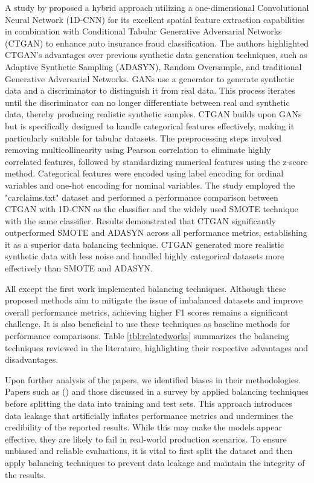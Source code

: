 \documentclass[twoside,11pt]{article}
\begin{document}
\begin{keywords}
A study by \cite{Wongpanti2024} proposed a hybrid approach utilizing a one-dimensional Convolutional Neural Network (1D-CNN) for its excellent spatial feature extraction capabilities in combination with Conditional Tabular Generative Adversarial Networks (CTGAN) to enhance auto insurance fraud classification. The authors highlighted CTGAN’s advantages over previous synthetic data generation techniques, such as Adaptive Synthetic Sampling (ADASYN), Random Oversample, and traditional Generative Adversarial Networks. GANs use a generator to generate synthetic data and a discriminator to distinguish it from real data. This process iterates until the discriminator can no longer differentiate between real and synthetic data, thereby producing realistic synthetic samples. CTGAN builds upon GANs but is specifically designed to handle categorical features effectively, making it particularly suitable for tabular datasets. The preprocessing steps involved removing multicollinearity using Pearson correlation to eliminate highly correlated features, followed by standardizing numerical features using the z-score method. Categorical features were encoded using label encoding for ordinal variables and one-hot encoding for nominal variables. The study employed the "carclaims.txt" dataset and performed a performance comparison between CTGAN with 1D-CNN as the classifier and the widely used SMOTE technique with the same classifier. Results demonstrated that CTGAN significantly outperformed SMOTE and ADASYN across all performance metrics, establishing it as a superior data balancing technique. CTGAN generated more realistic synthetic data with less noise and handled highly categorical datasets more effectively than SMOTE and ADASYN.

All except the first work implemented balancing techniques. Although these proposed methods aim to mitigate the issue of imbalanced datasets and improve overall performance metrics, achieving higher F1 scores remains a significant challenge. It is also beneficial to use these techniques as baseline methods for performance comparisons. Table \ref{tbl:relatedworks} summarizes the balancing techniques reviewed in the literature, highlighting their respective advantages and disadvantages.

Upon further analysis of the papers, we identified biases in their methodologies. Papers such as (\citealp{Harjai2019, Padhi2020}) and those discussed in a survey by \cite{schrijverAutomobileInsuranceFraud2024} applied balancing techniques before splitting the data into training and test sets. This approach introduces data leakage that artificially inflates performance metrics and undermines the credibility of the reported results. While this may make the models appear effective, they are likely to fail in real-world production scenarios. To ensure unbiased and reliable evaluations, it is vital to first split the dataset and then apply balancing techniques to prevent data leakage and maintain the integrity of the results. 



\end{keywords}
\end{document}
